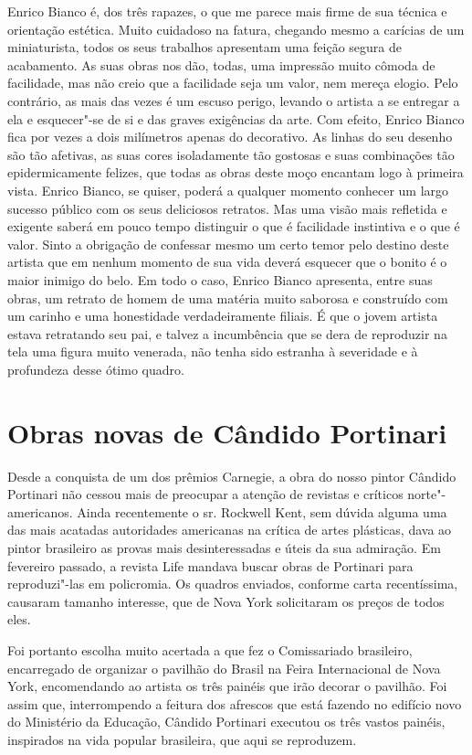 Enrico Bianco é, dos três rapazes, o que me parece mais firme de sua
técnica e orientação estética. Muito cuidadoso na fatura, chegando mesmo
a carícias de um miniaturista, todos os seus trabalhos apresentam uma
feição segura de acabamento. As suas obras nos dão, todas, uma impressão
muito cômoda de facilidade, mas não creio que a facilidade seja um
valor, nem mereça elogio. Pelo contrário, as mais das vezes é um escuso
perigo, levando o artista a se entregar a ela e esquecer"-se de si e das
graves exigências da arte. Com efeito, Enrico Bianco fica por vezes a
dois milímetros apenas do decorativo. As linhas do seu desenho são tão
afetivas, as suas cores isoladamente tão gostosas e suas combinações tão
epidermicamente felizes, que todas as obras deste moço encantam logo à
primeira vista. Enrico Bianco, se quiser, poderá a qualquer momento
conhecer um largo sucesso público com os seus deliciosos retratos. Mas
uma visão mais refletida e exigente saberá em pouco tempo distinguir o
que é facilidade instintiva e o que é valor. Sinto a obrigação de
confessar mesmo um certo temor pelo destino deste artista que em nenhum
momento de sua vida deverá esquecer que o bonito é o maior inimigo do
belo. Em todo o caso, Enrico Bianco apresenta, entre suas obras, um
retrato de homem de uma matéria muito saborosa e construído com um
carinho e uma honestidade verdadeiramente filiais. É que o jovem artista
estava retratando seu pai, e talvez a incumbência que se dera de
reproduzir na tela uma figura muito venerada, não tenha sido estranha à
severidade e à profundeza desse ótimo quadro.

\chapter{Obras novas de Cândido Portinari}

Desde a conquista de um dos prêmios Carnegie, a obra do nosso pintor
Cândido Portinari não cessou mais de preocupar a atenção de revistas e
críticos norte"-americanos. Ainda recentemente o sr. Rockwell Kent, sem
dúvida alguma uma das mais acatadas autoridades americanas na crítica de
artes plásticas, dava ao pintor brasileiro as provas mais
desinteressadas e úteis da sua admiração. Em fevereiro passado, a
revista Life mandava buscar obras de Portinari para reproduzi"-las em
policromia. Os quadros enviados, conforme carta recentíssima, causaram
tamanho interesse, que de Nova York solicitaram os preços de todos eles.

Foi portanto escolha muito acertada a que fez o Comissariado brasileiro,
encarregado de organizar o pavilhão do Brasil na Feira Internacional de
Nova York, encomendando ao artista os três painéis que irão decorar o
pavilhão. Foi assim que, interrompendo a feitura dos afrescos que está
fazendo no edifício novo do Ministério da Educação, Cândido Portinari
executou os três vastos painéis, inspirados na vida popular brasileira,
que aqui se reproduzem.

